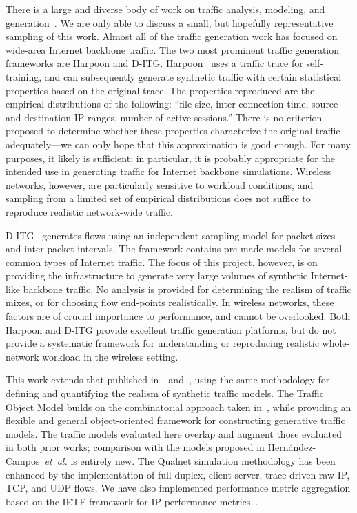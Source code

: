\documentclass[conference]{IEEEtran}
\newcommand{\caps}[1]{{\small{#1}}}
\newcommand{\FHC}{Hern\'andez-Campos~\textit{et~al.}}
\begin{document}
There is a large and diverse body of work on traffic analysis, modeling, and generation~\cite{Paxson95,Paxson96,Sommers04,Avallone04,Hernandez06:dissertation}. We are only able to discuss a small, but hopefully representative sampling of this work. Almost all of the traffic generation work has focused on wide-area Internet backbone traffic.
The two most prominent traffic generation frameworks are Harpoon and \caps{D-ITG}. Harpoon~\cite{Sommers04} uses a traffic trace for self-training, and can subsequently generate synthetic traffic with certain statistical properties based on the original trace. The properties reproduced are the empirical distributions of the following: ``file size, inter-connection time, source and destination IP ranges, number of active sessions.'' There is no criterion proposed to determine whether these properties characterize the original traffic adequately---we can only hope that this approximation is good enough. For many purposes, it likely is sufficient; in particular, it is probably appropriate for the intended use in generating traffic for Internet backbone simulations. Wireless networks, however, are particularly sensitive to workload conditions, and sampling from a limited set of empirical distributions does not suffice to reproduce realistic network-wide traffic.

\caps{D-ITG}~\cite{Avallone04} generates flows using an independent sampling model for packet sizes and inter-packet intervals. The framework contains pre-made models for several common types of Internet traffic. The focus of this project, however, is on providing the infrastructure to generate very large volumes of synthetic Internet-like backbone traffic. No analysis is provided for determining the realism of traffic mixes, or for choosing flow end-points realistically. In wireless networks, these factors are of crucial importance to performance, and cannot be overlooked. Both Harpoon and \caps{D-ITG} provide excellent traffic generation platforms, but do not provide a systematic framework for understanding or reproducing realistic whole-network workload in the wireless setting.

This work extends that published in~\cite{Karpinski07:realism}~and~\cite{Karpinski07:cbr-failure}, using the same methodology for defining and quantifying the realism of synthetic traffic models. The Traffic Object Model builds on the combinatorial approach taken in~\cite{Karpinski07:cbr-failure}, while providing an flexible and general object-oriented framework for constructing generative traffic models. The traffic models evaluated here overlap and augment those evaluated in both prior works; comparison with the models proposed in {\FHC} is entirely new. The Qualnet simulation methodology has been enhanced by the implementation of full-duplex, client-server, trace-driven raw \caps{IP}, \caps{TCP}, and \caps{UDP} flows. We have also implemented performance metric aggregation based on the \caps{IETF} framework for \caps{IP} performance metrics~\cite{rfc:ip-metrics,rfc:jitter}.
\end{document}
